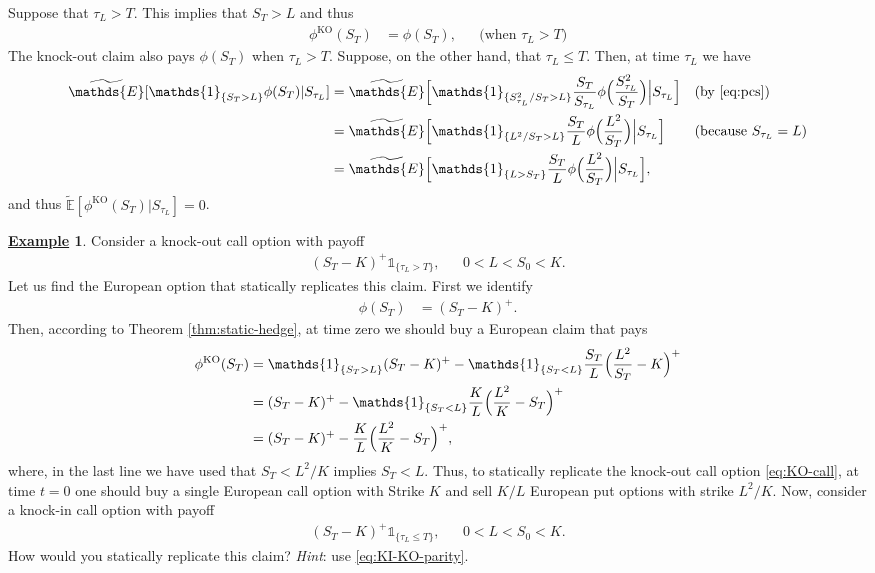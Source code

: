 \documentclass[12pt]{book}
\numberwithin{equation}{chapter}
\theoremstyle{plain}
\numberwithin{theorem}{section}
\theoremstyle{definition}
\newtheorem{example}[theorem]{\underline{Example}}
\numberwithin{exercise}{chapter}
\let\oldendproof\endproof
\renewenvironment{proof}[1][\proofname]{%
  \oldproof[\scshape\underline{#1}]%
}{\oldendproof}
\newcommand{\<}{\langle}
\renewcommand{\>}{\rangle}
\renewcommand{\(}{\left(}
\renewcommand{\)}{\right)}
\renewcommand{\[}{\left[}
\renewcommand{\]}{\right]}
\newcommand\Eb{\mathds{E}}
\newcommand\Ib{\mathds{1}}
\newcommand\Ebt{\widetilde{\Eb}}
\theoremstyle{definition}
\numberwithin{question}{section}
\begin{document}
\begin{proof}
Suppose that $\tau_L > T$.  This implies that $S_T > L$ and thus
\begin{align}
\phi^\text{KO}(S_T)
	&=	\phi(S_T) , &
	&\text{(when $\tau_L > T$)}
\end{align}
The knock-out claim also pays $\phi(S_T)$ when $\tau_L > T$.  Suppose, on the other hand, that $\tau_L \leq T$.  Then, at time $\tau_L$ we have
\begin{align}
\Ebt[ \Ib_{\{ S_T > L \}} \phi(S_T) | S_{\tau_L} ]
	&=	\Ebt\Big[ \Ib_{\{ S_{\tau_L}^2/S_T > L \}} \frac{S_T}{S_{\tau_L}} \phi \Big( \frac{S_{\tau_L}^2}{S_T} \Big) \Big| S_{\tau_L} \Big] &
	&\text{(by \eqref{eq:pcs})} \\
	&=	\Ebt\Big[ \Ib_{\{ L^2/S_T > L \}} \frac{S_T}{L} \phi \Big( \frac{L^2}{S_T} \Big) \Big| S_{\tau_L} \Big] &
	&\text{(because $S_{\tau_L} = L$)} \\
	&=	\Ebt\Big[ \Ib_{\{ L > S_T \}} \frac{S_T}{L} \phi \Big( \frac{L^2}{S_T} \Big) \Big| S_{\tau_L} \Big] ,
\end{align}
and thus $\Ebt[ \phi^\text{KO}(S_T) | S_{\tau_L} ] = 0$.
\end{proof}

\begin{example}
Consider a knock-out call option with payoff
\begin{align}
(S_T - K)^+ \Ib_{\{\tau_L > T\}} , && 0 < L < S_0 < K . \label{eq:KO-call}
\end{align}
Let us find the European option that statically replicates this claim.  First we identify
\begin{align}
\phi(S_T)
	&=	(S_T - K)^+ .
\end{align}
Then, according to Theorem \ref{thm:static-hedge}, at time zero we should buy a European claim that pays
\begin{align}
\phi^\textup{KO}(S_T)
	&=	\Ib_{\{ S_T > L \}} (S_T-K)^+ - \Ib_{\{ S_T < L \}} \frac{S_T}{L} \Big(\frac{L^2}{S_T} - K\Big)^+ \\
	&=	(S_T-K)^+ - \Ib_{\{ S_T < L \}} \frac{K}{L} \Big( \frac{ L^2}{K} - S_T \Big)^+ \\
	&=	(S_T-K)^+ -  \frac{K}{L} \Big( \frac{ L^2}{K} - S_T \Big)^+ ,
\end{align}
where, in the last line we have used that $S_T < L^2/K$ implies $S_T < L$.  Thus, to statically replicate the knock-out call option \eqref{eq:KO-call}, at time $t=0$ one should buy a single European call option with Strike $K$ and sell $K/L$ European put options with strike $L^2/K$.  Now, consider a knock-in call option with payoff
\begin{align}
(S_T - K)^+ \Ib_{\{\tau_L \leq T\}} , && 0 < L < S_0 < K . \label{eq:KI-call}
\end{align}
How would you statically replicate this claim?  \textit{Hint}: use \eqref{eq:KI-KO-parity}.
\end{example}
\end{document}
